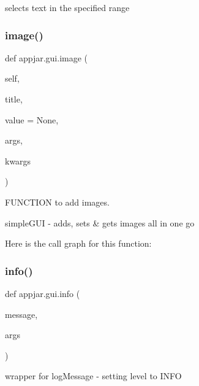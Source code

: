\begin{DoxyVerb}selects text in the specified range \end{DoxyVerb}
 \mbox{\label{classappjar_1_1gui_a7bf059e8a509826c130aacb56902d593}} 
\subsubsection{\texorpdfstring{image()}{image()}}
{\footnotesize\ttfamily def appjar.\+gui.\+image (\begin{DoxyParamCaption}\item[{}]{self,  }\item[{}]{title,  }\item[{}]{value = {\ttfamily None},  }\item[{}]{args,  }\item[{}]{kwargs }\end{DoxyParamCaption})}



F\+U\+N\+C\+T\+I\+ON to add images. 

\begin{DoxyVerb}simpleGUI - adds, sets & gets images all in one go \end{DoxyVerb}
 Here is the call graph for this function\+:
\mbox{\label{classappjar_1_1gui_ab6be724ff9fd035b9af554a06b4fffb0}} 
\subsubsection{\texorpdfstring{info()}{info()}}
{\footnotesize\ttfamily def appjar.\+gui.\+info (\begin{DoxyParamCaption}\item[{}]{message,  }\item[{}]{args }\end{DoxyParamCaption})\hspace{0.3cm}{\ttfamily [static]}}

\begin{DoxyVerb}wrapper for logMessage - setting level to INFO \end{DoxyVerb}
 \mbox{\label{classappjar_1_1gui_a161659a9096715ced2da924ab88ddecc}} 
